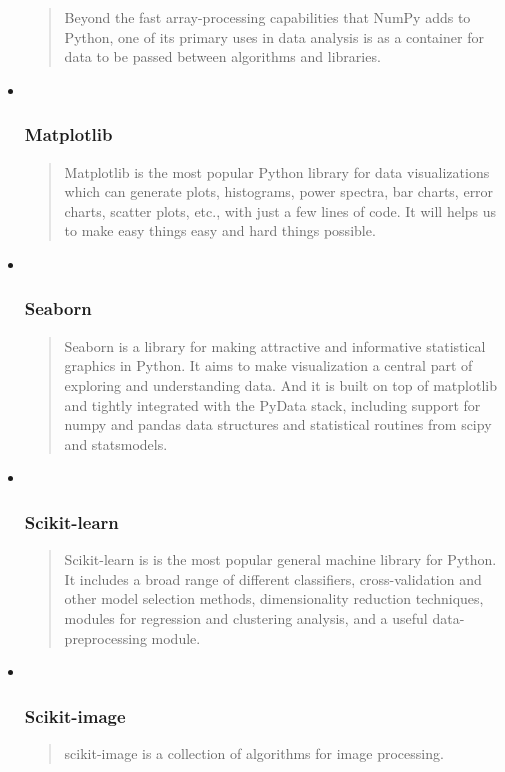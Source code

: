 \documentclass[11pt]{article}
\begin{document}
\begin{itemize}
  \begin{quote}
  Beyond the fast array-processing capabilities that NumPy adds to
  Python, one of its primary uses in data analysis is as a container for
  data to be passed between algorithms and libraries.
  \end{quote}
\item ~
  \subsubsection{Matplotlib}\label{matplotlib}

  \begin{quote}
  Matplotlib is the most popular Python library for data visualizations
  which can generate plots, histograms, power spectra, bar charts, error
  charts, scatter plots, etc., with just a few lines of code. It will
  helps us to make easy things easy and hard things possible.
  \end{quote}
\item ~
  \subsubsection{Seaborn}\label{seaborn}

  \begin{quote}
  Seaborn is a library for making attractive and informative statistical
  graphics in Python. It aims to make visualization a central part of
  exploring and understanding data. And it is built on top of matplotlib
  and tightly integrated with the PyData stack, including support for
  numpy and pandas data structures and statistical routines from scipy
  and statsmodels.
  \end{quote}
\item ~
  \subsubsection{Scikit-learn}\label{scikit-learn}

  \begin{quote}
  Scikit-learn is is the most popular general machine library for
  Python. It includes a broad range of different classifiers,
  cross-validation and other model selection methods, dimensionality
  reduction techniques, modules for regression and clustering analysis,
  and a useful data-preprocessing module.
  \end{quote}
\item ~
  \subsubsection{Scikit-image}\label{scikit-image}

  \begin{quote}
  scikit-image is a collection of algorithms for image processing.
  \end{quote}
\end{itemize}
\end{document}
